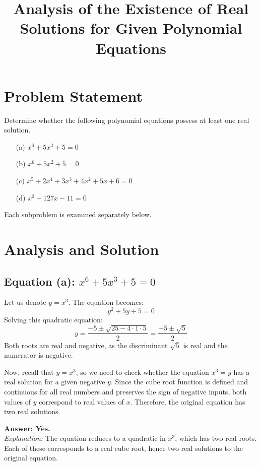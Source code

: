 \documentclass[12pt]{article}
\title{Analysis of the Existence of Real Solutions for Given Polynomial Equations}
\author{}
\date{}
\begin{document}
\maketitle

\section{Problem Statement}

Determine whether the following polynomial equations possess at least one real solution.

\begin{enumerate}
    \item[(a)] \( x^6 + 5x^3 + 5 = 0 \)
    \item[(b)] \( x^6 + 5x^2 + 5 = 0 \)
    \item[(c)] \( x^5 + 2x^4 + 3x^3 + 4x^2 + 5x + 6 = 0 \)
    \item[(d)] \( x^2 + 127x - 11 = 0 \)
\end{enumerate}

Each subproblem is examined separately below.

\section{Analysis and Solution}

\subsection{Equation (a): \( x^6 + 5x^3 + 5 = 0 \)}

Let us denote \( y = x^3 \). The equation becomes:
\[
y^2 + 5y + 5 = 0
\]
Solving this quadratic equation:
\[
y = \frac{-5 \pm \sqrt{25 - 4 \cdot 1 \cdot 5}}{2} = \frac{-5 \pm \sqrt{5}}{2}
\]
Both roots are real and negative, as the discriminant \( \sqrt{5} \) is real and the numerator is negative.

Now, recall that \( y = x^3 \), so we need to check whether the equation \( x^3 = y \) has a real solution for a given negative \( y \). Since the cube root function is defined and continuous for all real numbers and preserves the sign of negative inputs, both values of \( y \) correspond to real values of \( x \). Therefore, the original equation has two real solutions.

\textbf{Answer: Yes.} \\
\textit{Explanation:} The equation reduces to a quadratic in \( x^3 \), which has two real roots. Each of these corresponds to a real cube root, hence two real solutions to the original equation.
\end{document}
